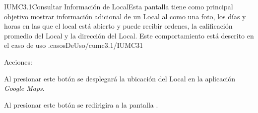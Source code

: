 \begin{IU}{IUMC3.1}{Consultar Información de Local}{Esta pantalla tiene como principal objetivo mostrar información adicional de un Local al  como una foto, los días y horas en las que el local está abierto y puede recibir ordenes, la calificación promedio del Local y la dirección del Local. Este comportamiento está descrito en el caso de uso .}{casosDeUso/cumc3.1/IUMC31}
	\item[Acciones:]\hspace{1pt}
		\begin{Citemize}
			\item	{} Al presionar este botón se desplegará la ubicación del Local en la aplicación \textit{Google Maps}.
			\item  \backIcon{} Al presionar este botón se redirigira a la pantalla .
		\end{Citemize}
\end{IU}


